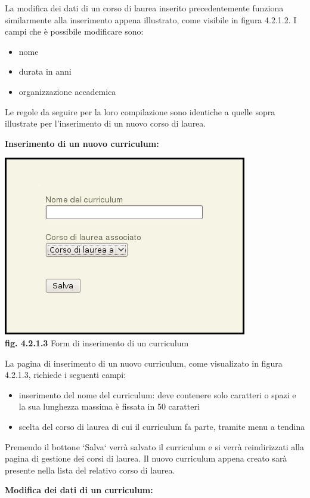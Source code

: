 \documentclass[11pt,a4paper]{article}
\begin{document}
La modifica dei dati di un corso di laurea inserito precedentemente funziona similarmente alla inserimento appena illustrato, come visibile in figura 4.2.1.2. I campi che è possibile modificare sono:
\begin{itemize}
 \item nome
 \item durata in anni
 \item organizzazione accademica
\end{itemize}
Le regole da seguire per la loro compilazione sono identiche a quelle sopra illustrate per l'inserimento di un nuovo corso di laurea.
\newline \newline
\begin{large}\textbf{Inserimento di un nuovo curriculum:}\end{large}

\begin{center}
	\includegraphics[scale=0.5]{images/nuovo_curriculum.jpg}\\
	\textbf{fig. 4.2.1.3} Form di inserimento di un curriculum\\
\end{center}

La pagina di inserimento di un nuovo curriculum, come visualizato in figura 4.2.1.3, richiede i seguenti campi:
\begin{itemize}
 \item inserimento del nome del curriculum: deve contenere solo caratteri o spazi e la sua lunghezza massima è fissata in 50 caratteri
 \item scelta del corso di laurea di cui il curriculum fa parte, tramite menu a tendina
\end{itemize}
Premendo il bottone `Salva` verrà salvato il curriculum e si verrà reindirizzati alla pagina di gestione dei corsi di laurea. Il nuovo curriculum appena creato sarà presente nella lista del relativo corso di laurea.
\newline \newline
\begin{large}\textbf{Modifica dei dati di un curriculum:}\end{large}
\end{document}
